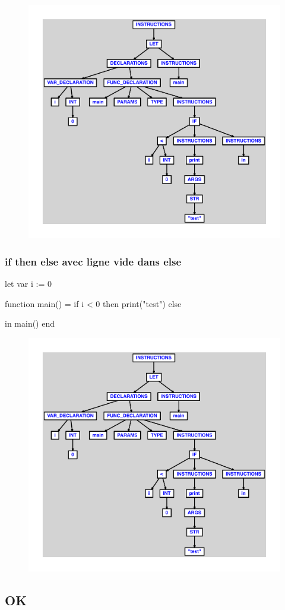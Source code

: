 \documentclass{article}
\begin{document}
\begin{figure}[H]\centering\includegraphics[max width=\textwidth]{ast/ast_246.pdf}\end{figure}\subsubsection{if then else avec ligne vide dans else}
\begin{verbatimtab}
let
	var i := 0

	function main() =
		if i < 0 then
			print("test")
		else

in main() end
\end{verbatimtab}
\begin{figure}[H]\centering\includegraphics[max width=\textwidth]{ast/ast_247.pdf}\end{figure}\subsection{OK}
\end{document}

